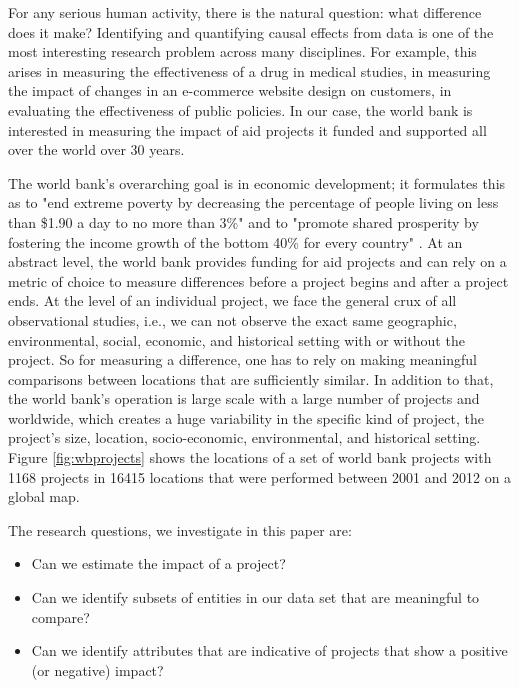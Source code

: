 For any serious human activity, there is the natural question: what difference does it make? 
Identifying and quantifying causal effects from data is one of the most interesting  research problem across many disciplines. 
For example, this arises in measuring the effectiveness of a drug in medical studies, in measuring the impact of changes in an e-commerce website design on customers, in evaluating the effectiveness of public policies. In our case, the world bank is interested in measuring the impact of aid projects it funded and supported all over the world over 30 years. 

The world bank's overarching goal is in economic development;  it formulates this as to "end extreme poverty by decreasing the percentage of people living on less than \$1.90 a day to no more than 3\%"  and to "promote shared prosperity by fostering the income growth of the bottom 40\% for every country" \cite{worldbankwebsite}. At an abstract level, the world bank provides funding for aid projects and can rely on a metric of choice to measure differences before a project begins and after a project ends. 
At the level of an individual project, we face the general crux of all observational studies, i.e., we can not observe the exact same geographic, environmental, social, economic, and historical setting with or without the project. So for measuring a difference, one has to rely on making meaningful comparisons between locations that are sufficiently similar. In addition to that, the world bank's operation is large scale with a large number of projects and worldwide, which creates a huge variability in the specific kind of project, the project's size, location, socio-economic, environmental, and historical setting. Figure \ref{fig:wbprojects} shows the locations of a set of world bank projects with 1168 projects in 16415 locations  that were performed between 2001 and 2012 on a global map.

The research questions, we investigate in this paper are:
\begin{itemize}
\item Can we estimate the impact of a project?
\item Can we identify subsets of entities in our data set that are meaningful to compare?
\item Can we identify attributes that are indicative of projects that show a positive (or negative) impact?
\end{itemize}


